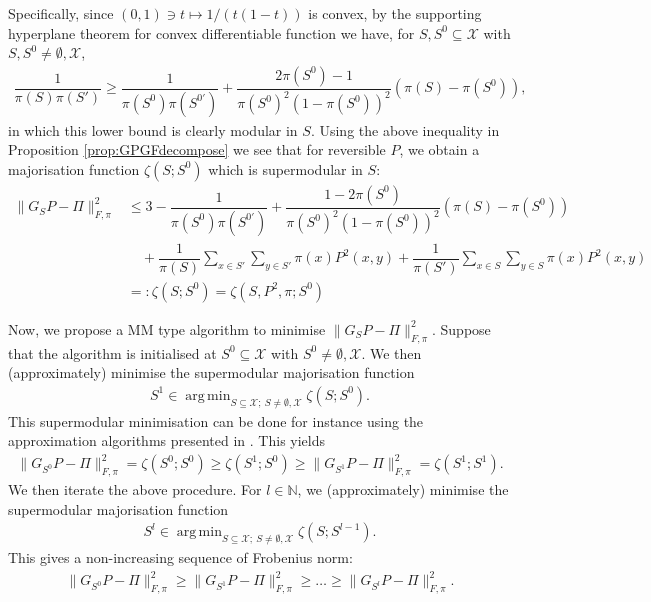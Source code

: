 \documentclass[EJP]{ejpecp} %
\DeclareMathOperator*{\argmin}{arg\,min}
\begin{document}
Specifically, since $(0,1) \ni t \mapsto 1/(t(1-t))$ is convex, by the supporting hyperplane theorem for convex differentiable function we have, for $S,S^0 \subseteq \mathcal{X}$ with $S, S^0 \neq \emptyset,\mathcal{X}$, 
\begin{align*}
    \dfrac{1}{\pi(S)\pi(S')} \geq \dfrac{1}{\pi(S^0)\pi(S^{0'})} + \dfrac{2\pi(S^0) - 1}{\pi(S^0)^2 (1 - \pi(S^0))^2}(\pi(S) - \pi(S^0)),
\end{align*}
in which this lower bound is clearly modular in $S$. Using the above inequality in Proposition \ref{prop:GPGFdecompose} we see that for reversible $P$, we obtain a majorisation function $\zeta(S;S^0)$ which is supermodular in $S$:
\begin{align*}
            \|G_SP - \Pi\|_{F, \pi}^2 &\leq 3 - \dfrac{1}{\pi(S^0)\pi(S^{0'})} + \dfrac{1 - 2\pi(S^0)}{\pi(S^0)^2 (1 - \pi(S^0))^2}(\pi(S) - \pi(S^0)) \\
            &\quad + \dfrac{1}{\pi(S)} \sum_{x \in S'} \sum_{y \in S'} \pi(x) P^2(x,y) 
            + \dfrac{1}{\pi(S')} \sum_{x \in S} \sum_{y \in S} \pi(x) P^2(x,y) \\
            &=: \zeta(S;S^0) = \zeta(S,P^2,\pi;S^0)
\end{align*}

Now, we propose a MM type algorithm to minimise $\|G_SP - \Pi\|_{F, \pi}^2$. Suppose that the algorithm is initialised at $S^0 \subseteq \mathcal{X}$ with $S^0 \neq \emptyset,\mathcal{X}$. We then (approximately) minimise the supermodular majorisation function
\begin{align*}
    S^1 \in \argmin_{S \subseteq \mathcal{X};~ S \neq \emptyset, \mathcal{X}} \zeta(S;S^0).
\end{align*}
This supermodular minimisation can be done for instance using the approximation algorithms presented in \cite{uriel_2011}. This yields
\begin{align*}
    \|G_{S^0}P - \Pi\|_{F, \pi}^2 = \zeta(S^0;S^0) \geq \zeta(S^1;S^0) \geq \|G_{S^1}P - \Pi\|_{F, \pi}^2 = \zeta(S^1;S^1).
\end{align*}
We then iterate the above procedure. For $l \in \mathbb{N}$, we (approximately) minimise the supermodular majorisation function
\begin{align*}
    S^l \in \argmin_{S \subseteq \mathcal{X};~ S \neq \emptyset, \mathcal{X}} \zeta(S;S^{l-1}).
\end{align*}
This gives a non-increasing sequence of Frobenius norm:
\begin{align*}
    \|G_{S^0}P - \Pi\|_{F, \pi}^2 \geq \|G_{S^1}P - \Pi\|_{F, \pi}^2 \geq \ldots \geq \|G_{S^l}P - \Pi\|_{F, \pi}^2.
\end{align*}
\end{document}
